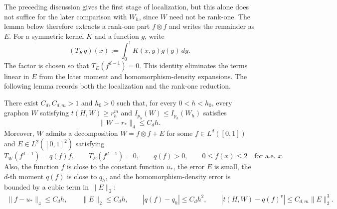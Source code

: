 The preceding discussion gives the first stage of localization, but this
alone does not suffice for the later comparison with $W_h$, since $W$ need
not be rank-one.  The lemma below therefore extracts a
rank-one part $f\otimes f$ and writes the remainder as $E$.  For a symmetric
kernel $K$ and a function $g$, write
\[
  (T_Kg)(x):=\int_0^1K(x,y)g(y)\,dy.
\]
The factor is chosen so that $T_E(f^{d-1})=0$.  This identity eliminates the
terms linear in $E$ from the later moment and homomorphism-density expansions.
The following lemma records both the localization and the rank-one reduction.

\begin{lemma}
\label{lem:localization-rank-one}
There exist $C_d,C_{d,m}>1$ and $h_0>0$ such that, for every
$0<h<h_0$, every graphon $W$ satisfying $t(H,W)\ge r_h^m$ and
$I_{p_h}(W)\le I_{p_h}(W_h)$ satisfies
\begin{equation}\label{eq:graphon-quartic-localization}
  \|W-r_*\|_4\le C_dh.
\end{equation}
Moreover, $W$ admits a decomposition $W=f\otimes f+E$ for some
$f\in L^d([0,1])$ and $E\in L^2([0,1]^2)$ satisfying
\begin{equation}\label{eq:rank-one-orthogonality}
  T_W(f^{d-1})=q(f)f,
  \qquad
  T_E(f^{d-1})=0,
  \qquad
  q(f)>0,
  \qquad
  0\le f(x) \le 2
  \quad\text{for a.e. }x.
\end{equation}
Also, the function $f$ is close to the constant function $u_*$, the error
$E$ is small, the $d$-th moment $q(f)$ is close to $q_h$, and the
homomorphism-density error is bounded by a cubic term in $\|E\|_2$:
\begin{equation}\label{eq:rank-one-reduction-bounds}
  \begin{gathered}
  \|f-u_*\|_4\le C_dh,
  \qquad
  \|E\|_2 \le C_dh,
  \qquad
  \left|q(f)-q_h\right|\le C_dh^2,
  \qquad
  |t(H,W)-q(f)^v| \le C_{d,m} \|E\|_2^3.
  \end{gathered}
\end{equation}
\end{lemma}

